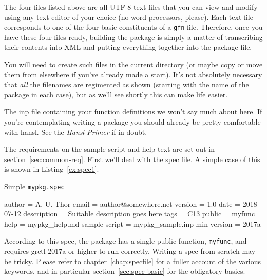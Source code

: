 \documentclass[oneside]{book}
\begin{document}
The four files listed above are all UTF-8 text files that you can view
and modify using any text editor of your choice (no word processors,
please). Each text file corresponds to one of the four basic
constituents of a \texttt{gfn} file. Therefore, once you have these
four files ready, building the package is simply a matter of
transcribing their contents into XML and putting everything together
into the package file.

You will need to create such files in the current directory (or maybe
copy or move them from elsewhere if you've already made a start). It's
not absolutely necessary that \textit{all} the filenames are
regimented as shown (starting with the name of the package in each
case), but as we'll see shortly this can make life easier.

The \textsf{inp} file containing your function definitions we won't
say much about here. If you're contemplating writing a package you
should already be pretty comfortable with hansl. See the \textit{Hansl
  Primer} \citep{hansl-primer} if in doubt.

The requirements on the sample script and help text are set out in
section~\ref{sec:common-req}.  First we'll deal with the \textsf{spec}
file. A simple case of this is shown in Listing~\ref{ex:spec1}.

\begin{script}[htbp]
  \caption{Simple \texttt{mypkg.spec}}
  \label{ex:spec1}
\begin{code}
author = A. U. Thor
email = author@somewhere.net
version = 1.0
date = 2018-07-12
description = Suitable description goes here
tags = C13
public = myfunc
help = mypkg_help.md
sample-script = mypkg_sample.inp
min-version = 2017a
\end{code}
\end{script}

According to this spec, the package has a single public function,
\texttt{myfunc}, and requires gretl 2017a or higher to run
correctly. Writing a \textsf{spec} from scratch may be tricky. Please
refer to chapter~\ref{chap:specfile} for a fuller account of the
various keywords, and in particular section~\ref{sec:spec-basic} for
the obligatory basics.
\end{document}

